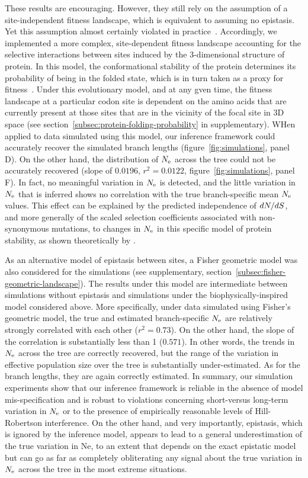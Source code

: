 These results are encouraging.
However, they still rely on the assumption of a site-independent fitness landscape, which is equivalent to assuming no epistasis.
Yet this assumption almost certainly violated in practice~\citep{Pollock2014,Shah2015}.
Accordingly, we implemented a more complex, site-dependent fitness landscape accounting for the selective interactions between sites induced by the 3-dimensional structure of protein.
In this model, the conformational stability of the protein determines its probability of being in the folded state, which is in turn taken as a proxy for fitness~\citep{Williams2006, Goldstein2011, Pollock2012}.
Under this evolutionary model, and at any gven time, the fitness landscape at a particular codon site is dependent on the amino acids that are currently present at those sites that are in the vicinity of the focal site in 3D space (see section~\ref{subsec:protein-folding-probability} in supplementary).
WHen applied to data simulated using this model, our inference framework could accurately recover the simulated branch lengths (figure~\ref{fig:simulations}, panel D).
On the other hand, the distribution of $N_{\text{e}}$ across the tree could not be accurately recovered (slope of $0.0196$, $r^2 = 0.0122$, figure~\ref{fig:simulations}, panel F).
In fact, no meaningful variation in $N_{\text{e}}$ is detected, and the little variation in $N_{\text{e}}$ that is inferred shows no correlation with the true branch-specific mean $N_{\text{e}}$ values.
This effect can be explained by the predicted independence of $dN/dS$, and more generally of the scaled selection coefficients associated with non-synonymous mutations, to changes in $N_{\text{e}}$ in this specific model of protein stability, as shown theoretically by \citet{Goldstein2013}.

As an alternative model of epistasis between sites, a Fisher geometric model was also considered for the simulations (see supplementary, section~\ref{subsec:fisher-geometric-landscape}).
The results under this model are intermediate between simulations without epistasis and simulations under the biophysically-inspired model considered above.
More specifically, under data simulated using Fisher’s geometric model, the true and estimated branch-specific $N_{\text{e}}$ are relatively strongly correlated with each other ($r^2 = 0.73$).
On the other hand, the slope of the correlation is substantially less than 1 ($0.571$).
In other words, the trends in $N_{\text{e}}$ across the tree are correctly recovered, but the range of the variation in effective population size over the tree is substantially under-estimated.
As for the branch lengths, they are again correctly estimated.
In summary, our simulation experiments show that our inference framework is reliable in the absence of model mis-specification and is robust to violations concerning short-versus long-term variation in $N_{\text{e}}$ or to the presence of empirically reasonable levels of Hill-Robertson interference.
On the other hand, and very importantly, epistasis, which is ignored by the inference model, appears to lead to a general underestimation of the true variation in Ne, to an extent that depends on the exact epistatic model but can go as far as completely obliterating any signal about the true variation in $N_{\text{e}}$ across the tree in the most extreme situations.

